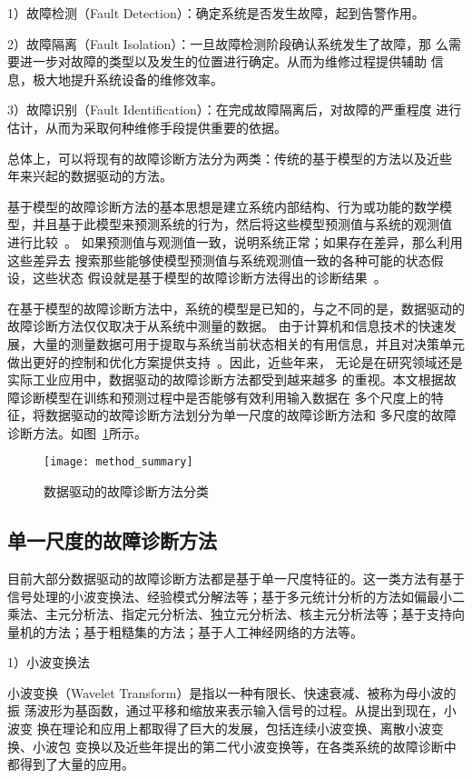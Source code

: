 1）故障检测（Fault Detection）：确定系统是否发生故障，起到告警作用。

2）故障隔离（Fault Isolation）：一旦故障检测阶段确认系统发生了故障，那
么需要进一步对故障的类型以及发生的位置进行确定。从而为维修过程提供辅助
信息，极大地提升系统设备的维修效率。

3）故障识别（Fault Identification）：在完成故障隔离后，对故障的严重程度
进行估计，从而为采取何种维修手段提供重要的依据。

总体上，可以将现有的故障诊断方法分为两类：传统的基于模型的方法以及近些
年来兴起的数据驱动的方法。

基于模型的故障诊断方法的基本思想是建立系统内部结构、行为或功能的数学模
型，并且基于此模型来预测系统的行为，然后将这些模型预测值与系统的观测值
进行比较~\cite{console1999model, davis1988model, mosterman1998comprehensive}。
如果预测值与观测值一致，说明系统正常；如果存在差异，那么利用这些差异去
搜索那些能够使模型预测值与系统观测值一致的各种可能的状态假设，这些状态
假设就是基于模型的故障诊断方法得出的诊断结果~\cite{wotawa2000debugging, friedrich1999model}。

在基于模型的故障诊断方法中，系统的模型是已知的，与之不同的是，数据驱动的
故障诊断方法仅仅取决于从系统中测量的数据。 由于计算机和信息技术的快速发
展，大量的测量数据可用于提取与系统当前状态相关的有用信息，并且对决策单元
做出更好的控制和优化方案提供支持~\cite{yin2012comparison}。因此，近些年来，
无论是在研究领域还是实际工业应用中，数据驱动的故障诊断方法都受到越来越多
的重视。本文根据故障诊断模型在训练和预测过程中是否能够有效利用输入数据在
多个尺度上的特征，将数据驱动的故障诊断方法划分为单一尺度的故障诊断方法和
多尺度的故障诊断方法。如图~\ref{fig:method_summary}所示。
\begin{figure}[ht]
  \centering
  \texttt{[image: method\_summary]}
  \caption{数据驱动的故障诊断方法分类}
  \label{fig:method_summary}
\end{figure}

\subsection{单一尺度的故障诊断方法}

目前大部分数据驱动的故障诊断方法都是基于单一尺度特征的。这一类方法有基于
信号处理的小波变换法、经验模式分解法等；基于多元统计分析的方法如偏最小二
乘法、主元分析法、指定元分析法、独立元分析法、核主元分析法等；基于支持向
量机的方法；基于粗糙集的方法；基于人工神经网络的方法等。

1）小波变换法

小波变换（Wavelet Transform）是指以一种有限长、快速衰减、被称为母小波的振
荡波形为基函数，通过平移和缩放来表示输入信号的过程。从提出到现在，小波变
换在理论和应用上都取得了巨大的发展，包括连续小波变换、离散小波变换、小波包
变换以及近些年提出的第二代小波变换等，在各类系统的故障诊断中都得到了大量的应用。

